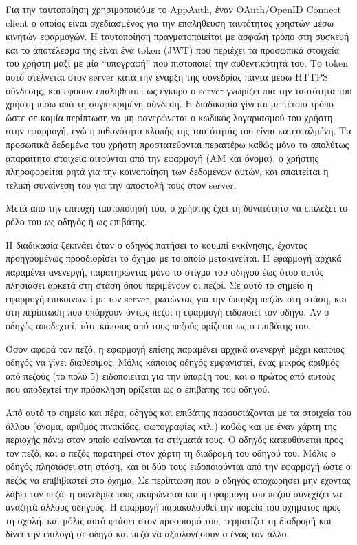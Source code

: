 \documentclass[../thesis.tex]{subfiles}
\begin{document}
\bigskip

Για την ταυτοποίηση χρησιμοποιούμε το AppAuth, έναν OAuth/OpenID Connect client ο οποίος είναι σχεδιασμένος για την επαλήθευση ταυτότητας χρηστών μέσω κινητών εφαρμογών.
Η ταυτοποίηση πραγματοποιείται με ασφαλή τρόπο στη συσκευή και το αποτέλεσμα της είναι ένα token (JWT) που περιέχει τα προσωπικά στοιχεία του χρήστη μαζί με μία ``υπογραφή'' που πιστοποιεί την αυθεντικότητά του.
Το token αυτό στέλνεται στον server κατά την έναρξη της συνεδρίας πάντα μέσω HTTPS σύνδεσης, και εφόσον επαληθευτεί ως έγκυρο ο server γνωρίζει πια την ταυτότητα του χρήστη πίσω από τη συγκεκριμένη σύνδεση.
Η διαδικασία γίνεται με τέτοιο τρόπο ώστε σε καμία περίπτωση να μη φανερώνεται ο κωδικός λογαριασμού του χρήστη στην εφαρμογή, ενώ η πιθανότητα κλοπής της ταυτότητάς του είναι κατεσταλμένη.
Τα προσωπικά δεδομένα του χρήστη προστατεύονται περαιτέρω καθώς μόνο τα απολύτως απαραίτητα στοιχεία αιτούνται από την εφαρμογή (ΑΜ και όνομα), ο χρήστης πληροφορείται ρητά για την κοινοποίηση των δεδομένων αυτών, και απαιτείται η τελική συναίνεση του για την αποστολή τους στον server.

\bigskip

Μετά από την επιτυχή ταυτοποίησή του, ο χρήστης έχει τη δυνατότητα να επιλέξει το ρόλο του ως οδηγός ή ως επιβάτης.

Η διαδικασία ξεκινάει όταν ο οδηγός πατήσει το κουμπί εκκίνησης, έχοντας προηγουμένως προσδιορίσει το όχημα με το οποίο μετακινείται.
Η εφαρμογή αρχικά παραμένει ανενεργή, παρατηρώντας μόνο το στίγμα του οδηγού έως ότου αυτός πλησιάσει αρκετά στη στάση όπου περιμένουν οι πεζοί.
Σε αυτό το σημείο η εφαρμογή επικοινωνεί με τον server, ρωτώντας για την ύπαρξη πεζών στη στάση, και στη περίπτωση που υπάρχουν όντως πεζοί η εφαρμογή ειδοποιεί τον οδηγό.
Αν ο οδηγός αποδεχτεί, τότε κάποιος από τους πεζούς ορίζεται ως ο επιβάτης του.

Όσον αφορά τον πεζό, η εφαρμογή επίσης παραμένει αρχικά ανενεργή μέχρι κάποιος οδηγός να γίνει διαθέσιμος.
Μόλις κάποιος οδηγός εμφανιστεί, ένας μικρός αριθμός από πεζούς (το πολύ 5) ειδοποιείται για την ύπαρξη του, και ο πρώτος από αυτούς που αποδεχτεί την πρόσκληση ορίζεται ως ο επιβάτης του οδηγού.

Από αυτό το σημείο και πέρα, οδηγός και επιβάτης παρουσιάζονται με τα στοιχεία του άλλου (όνομα, αριθμός πινακίδας, φωτογραφίες κτλ.) καθώς και με έναν χάρτη της περιοχής πάνω στον οποίο φαίνονται τα στίγματά τους.
Ο οδηγός κατευθύνεται προς τον πεζό, και ο πεζός παρατηρεί στον χάρτη τη διαδρομή του οδηγού του.
Μόλις ο οδηγός πλησιάσει στη στάση, και οι δύο τους ειδοποιούνται από την εφαρμογή ώστε ο πεζός να επιβιβαστεί στο όχημα.
Σε περίπτωση που ο οδηγός αποχωρήσει μην έχοντας λάβει τον πεζό, η συνεδρία τους ακυρώνεται και η εφαρμογή του πεζού συνεχίζει να αναζητά άλλους οδηγούς.
Η εφαρμογή παρακολουθεί την πορεία του οχήματος προς τη σχολή, και μόλις αυτό φτάσει στον προορισμό του, τερματίζει τη διαδρομή και δίνει την επιλογή σε οδηγό και πεζό να αξιολογήσουν ο ένας τον άλλο.
\end{document}

